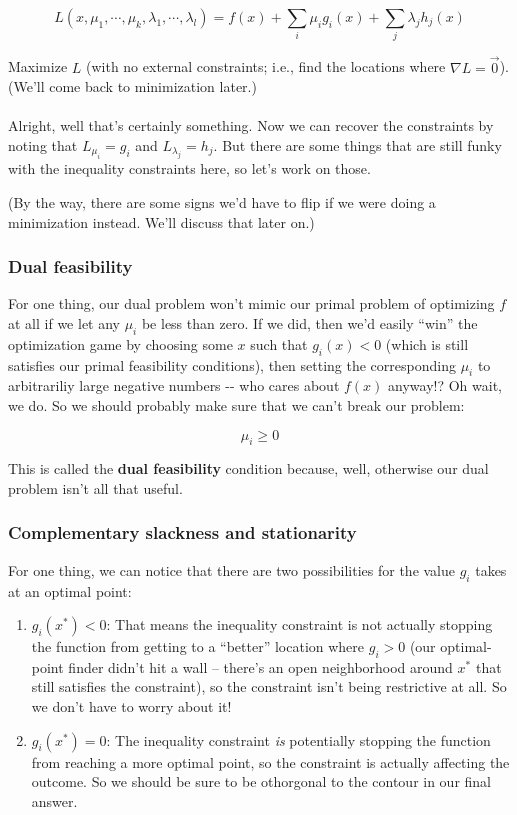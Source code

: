 \documentclass[letterpaper,12pt]{report}
\providecommand{\tightlist}{%
  \setlength{\itemsep}{0pt}\setlength{\parskip}{0pt}}
\begin{document}
\[L(x,\mu_1, \cdots, \mu_k, \lambda_1, \cdots, \lambda_l) = f(x) + \sum_i \mu_i g_i(x) + \sum_j \lambda_j h_j(x)\]

Maximize \(L\) (with no external constraints; i.e., find the locations
where \(\nabla L = \vec{0}\)). (We'll come back to minimization later.)
\\
\\
Alright, well that's certainly something. Now we can recover the
constraints by noting that \(L_{\mu_i} = g_i\) and
\(L_{\lambda_j} = h_j\). But there are some things that are still funky
with the inequality constraints here, so let's work on those.

(By the way, there are some signs we'd have to flip if we were 
doing a minimization instead. We'll discuss that later on.)

\subsubsection{Dual feasibility}\label{dual-feasibility}

For one thing, our dual problem won't mimic our primal problem of
optimizing \(f\) at all if we let any \(\mu_i\) be less than zero. If we
did, then we'd easily ``win'' the optimization game by choosing some \(x\)
such that \(g_i(x) < 0\) (which is still satisfies our primal
feasibility conditions), then setting the corresponding \(\mu_i\) to
arbitrariliy large negative numbers -\/- who cares about \(f(x)\)
anyway!? Oh wait, we do. So we should probably make sure that we can't
break our problem:

\[ \mu_i \geq 0 \]

This is called the \textbf{dual feasibility} condition because, well,
otherwise our dual problem isn't all that useful.

\subsubsection{Complementary slackness and
stationarity}\label{complementary-slackness-and-stationarity}

For one thing, we can notice that there are two possibilities for the
value \(g_i\) takes at an optimal point:

\begin{enumerate}
\def\labelenumi{\arabic{enumi}.}
\item
  \(g_i(x^*) < 0\): That means the inequality constraint is not actually
  stopping the function from getting to a ``better'' location where
  \(g_i > 0\) (our optimal-point finder didn't hit a wall -- there's an
  open neighborhood around \(x^*\) that still satisfies the constraint),
  so the constraint isn't being restrictive at all. So we don't have to
  worry about it!
\item
  \(g_i(x^*) = 0\): The inequality constraint \emph{is} potentially
  stopping the function from reaching a more optimal point, so the
  constraint is actually affecting the outcome. So we should be sure to
  be othorgonal to the contour in our final answer.
\end{enumerate}
\end{document}
